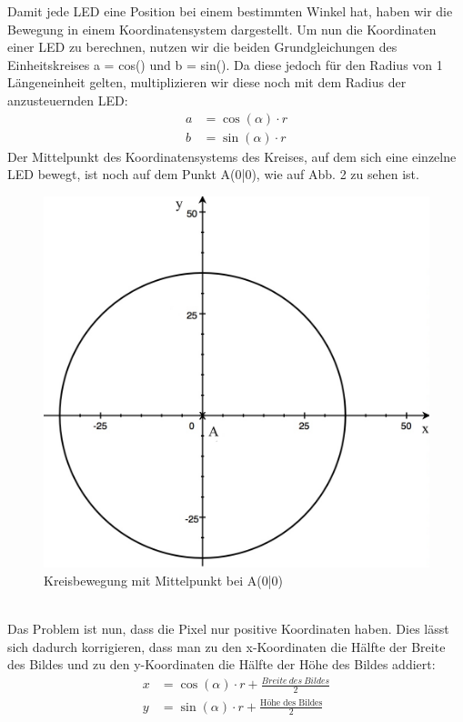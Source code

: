 \documentclass [a4paper, 11pt] {article}
\begin{document}
Damit jede LED eine Position bei einem bestimmten Winkel hat, haben wir die Bewegung in einem Koordinatensystem dargestellt. Um nun die Koordinaten einer LED zu berechnen, nutzen wir die beiden Grundgleichungen des Einheitskreises a = cos(\textalpha) und
b = sin(\textalpha). Da diese jedoch für den Radius von 1 Längeneinheit gelten, multiplizieren wir diese noch mit dem Radius der anzusteuernden LED:
\begin{align}
a &= \cos (\alpha) \cdot r \\
b &= \sin (\alpha) \cdot r 
\end{align}
Der Mittelpunkt des Koordinatensystems des Kreises, auf dem sich eine einzelne LED bewegt, ist noch auf dem Punkt A(0\big|0), wie auf Abb. 2 zu sehen ist. \\
\begin{figure}[h]
	\centering
	\includegraphics[width=12cm]{dia1.png}
	\caption{Kreisbewegung mit Mittelpunkt bei A(0\big|0)}
\end{figure}\\
Das Problem ist nun, dass die Pixel nur positive Koordinaten haben. Dies lässt sich dadurch korrigieren, dass man zu den x-Koordinaten die Hälfte der Breite des Bildes und zu den y-Koordinaten die Hälfte der Höhe des Bildes addiert:
\begin{align}
x &= \cos (\alpha) \cdot r + \frac{Breite \ des \ Bildes}{2} \\
y &= \sin (\alpha) \cdot r +  \frac{\text{Höhe\ des\ Bildes}}{2}
\end{align}
\end{document}
